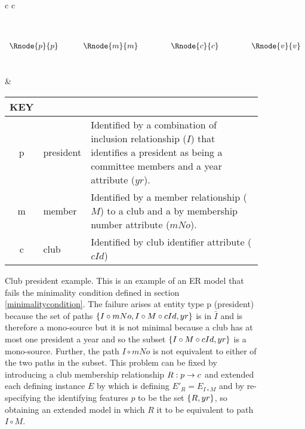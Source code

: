 \begin{figure} [h]
\begin{center}
\begin{tabular}{c c}
$
\begin{array}{cp{0.4cm}cp{0.75cm}cp{0.75cm}c}
              &&               &&                &&               \\[0.25cm]
              &&               &&                &&               \\[0.25cm]
\Rnode{p}{p}	&& \Rnode{m}{m}  &&   \Rnode{c}{c} && \Rnode{v}{v}  \\[0.25cm]
	            &&  
\end{array}
$

\idcomp
{}
\idcomp
{}
\idcomp
{}
\idcomp
{}
\idcomp
& \footnotesize
\begin{tabular}{c p{1.5cm} p{4cm}}
KEY && \\
\hline
p  & president        & Identified by a combination of inclusion relationship ($I$) that identifies a
                       president as being a committee members and a year attribute ($yr$). \\
m  & member           & Identified by a member relationship ($M$) to a club and a by membership 
                         number attribute ($mNo$). \\
c  & club             & Identified by club identifier attribute ($cId$)
\end{tabular} 
\end{tabular}
\end{center}
\caption{Club president example. 
This is an example of an ER model that fails the minimality condition defined in section \ref{minimalitycondition}.
The failure arises at entity type p (president) because 
the set of paths $\left\{I\circ mNo, I \circ M \circ cId, yr\right\}$ is
in $\bar{I}$ and is therefore a mono-source but it is not minimal because
 a club has at most one president a year and so the subset $\left\{I \circ M \circ cId, yr\right\}$ is  a
mono-source. Further, the path $I \circ mNo$ is not equivalent to either of the two paths in the subset.
This problem can be fixed by introducing a club membership relationship $R: p \rightarrow c$ and extended each defining instance $E$
 by which is defining $E'_R=E_{I \circ M}$  and by re-specifying the identifying features $p$ to be the set $\left\{R,yr\right\}$,
so obtaining an extended model in which $R$ it to be equivalent to
path $I \circ M$.
}
\label{clubpresidentbeforenormalisation}
\end{figure}